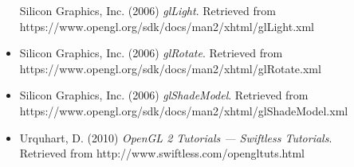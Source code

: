 \documentclass[a4paper,titlepage,12pt]{article}
\begin{document}
\begin{itemize}
Silicon Graphics, Inc. (2006)
\textit{glLight}.
Retrieved from \\
https://www.opengl.org/sdk/docs/man2/xhtml/glLight.xml
\item
Silicon Graphics, Inc. (2006)
\textit{glRotate}.
Retrieved from \\
https://www.opengl.org/sdk/docs/man2/xhtml/glRotate.xml
\item
Silicon Graphics, Inc. (2006)
\textit{glShadeModel}.
Retrieved from \\
https://www.opengl.org/sdk/docs/man2/xhtml/glShadeModel.xml
\item
Urquhart, D. (2010)
\textit{OpenGL 2 Tutorials --- Swiftless Tutorials}. \\
Retrieved from
http://www.swiftless.com/opengltuts.html
\end{itemize}
\end{document}
